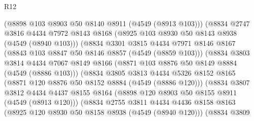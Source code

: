 \begin{lexlean}{R12}
\begin{coremodule}
                                (@8898 @103 @8903 @50 @8140 @8911 (@4549 (@8913 @103)))
                                (@8834
                                  @2747
                                  @3816
                                  @4434
                                  @7972
                                  @8143
                                  @8168
                                  (@8925 @103 @8930 @50 @8143 @8938 (@4549 (@8940 @103)))
                                  (@8834
                                    @3301
                                    @3815
                                    @4434
                                    @7971
                                    @8146
                                    @8167
                                    (@8843 @103 @8847 @50 @8146 @8857 (@4549 (@8859 @103)))
                                    (@8834
                                      @3803
                                      @3814
                                      @4434
                                      @7067
                                      @8149
                                      @8166
                                      (@8871 @103 @8876 @50 @8149 @8884 (@4549 (@8886 @103)))
                                      (@8834
                                        @3805
                                        @3813
                                        @4434
                                        @5326
                                        @8152
                                        @8165
                                        (@8871 @120 @8876 @50 @8152 @8884 (@4549 (@8886 @120)))
                                        (@8834
                                          @3807
                                          @3812
                                          @4434
                                          @4437
                                          @8155
                                          @8164
                                          (@8898 @120 @8903 @50 @8155 @8911 (@4549 (@8913 @120)))
                                          (@8834
                                            @2755
                                            @3811
                                            @4434
                                            @4436
                                            @8158
                                            @8163
                                            (@8925 @120 @8930 @50 @8158 @8938 (@4549 (@8940 @120)))
                                            (@8834
                                              @3809

\end{coremodule}
\end{lexlean}

